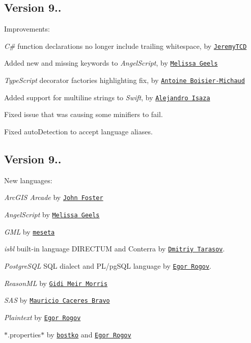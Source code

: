 \subsection*{Version 9..}

Improvements\+:


\begin{DoxyItemize}
\item {\itshape C\#} function declarations no longer include trailing whitespace, by \href{https://github.com/JeremyTCD}{\tt Jeremy\+T\+CD}
\item Added new and missing keywords to {\itshape Angel\+Script}, by \href{https://github.com/codecat}{\tt Melissa Geels}
\item {\itshape Type\+Script} decorator factories highlighting fix, by \href{https://github.com/Aboisier}{\tt Antoine Boisier-\/\+Michaud}
\item Added support for multiline strings to {\itshape Swift}, by \href{https://github.com/alejandro-isaza}{\tt Alejandro Isaza}
\item Fixed issue that was causing some minifiers to fail.
\item Fixed {\ttfamily auto\+Detection} to accept language aliases.
\end{DoxyItemize}

\subsection*{Version 9..}

New languages\+:


\begin{DoxyItemize}
\item {\itshape Arc\+G\+IS Arcade} by \href{https://github.com/jf990}{\tt John Foster}
\item {\itshape Angel\+Script} by \href{https://github.com/codecat}{\tt Melissa Geels}
\item {\itshape G\+ML} by \href{https://github.com/meseta}{\tt meseta}
\item {\itshape isbl} built-\/in language D\+I\+R\+E\+C\+T\+UM and Conterra by \href{https://github.com/MedvedTMN}{\tt Dmitriy Tarasov}.
\item {\itshape Postgre\+S\+QL} S\+QL dialect and P\+L/pg\+S\+QL language by \href{https://github.com/egor-rogov}{\tt Egor Rogov}.
\item {\itshape Reason\+ML} by \href{https://github.com/gmmorris}{\tt Gidi Meir Morris}
\item {\itshape S\+AS} by \href{https://github.com/mcaceresb}{\tt Mauricio Caceres Bravo}
\item {\itshape Plaintext} by \href{https://github.com/egor-rogov}{\tt Egor Rogov}
\item $\ast$.properties$\ast$ by \href{https://github.com/bostko}{\tt bostko} and \href{https://github.com/egor-rogov}{\tt Egor Rogov}
\end{DoxyItemize}

